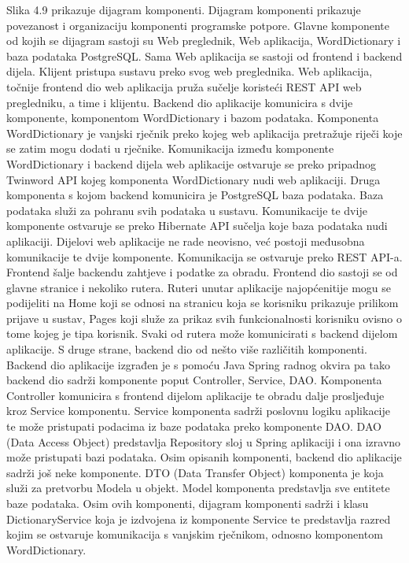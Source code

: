 			 Slika 4.9 prikazuje dijagram komponenti. Dijagram komponenti prikazuje povezanost i organizaciju komponenti programske potpore. Glavne komponente od kojih se dijagram sastoji su Web preglednik, Web aplikacija, WordDictionary i baza podataka PostgreSQL. Sama Web aplikacija se sastoji od frontend i backend dijela. Klijent pristupa sustavu preko svog web preglednika. Web aplikacija, točnije frontend dio web aplikacija pruža sučelje koristeći REST API web pregledniku, a time i klijentu. Backend dio aplikacije komunicira s dvije komponente, komponentom WordDictionary i bazom podataka. Komponenta WordDictionary je vanjski rječnik preko kojeg web aplikacija pretražuje riječi koje se zatim mogu dodati u rječnike. Komunikacija između komponente WordDictionary i backend dijela web aplikacije ostvaruje se preko pripadnog Twinword API kojeg komponenta WordDictionary nudi web aplikaciji. Druga komponenta s kojom backend komunicira je PostgreSQL baza podataka. Baza podataka služi za pohranu svih podataka u sustavu. Komunikacije te dvije komponente ostvaruje se preko Hibernate API sučelja koje baza podataka nudi aplikaciji. Dijelovi web aplikacije ne rade neovisno, već postoji međusobna komunikacije te dvije komponente. Komunikacija se ostvaruje preko REST API-a. Frontend šalje backendu zahtjeve i podatke za obradu. Frontend dio sastoji se od glavne stranice i nekoliko rutera. Ruteri unutar aplikacije najopćenitije mogu se podijeliti na Home koji se odnosi na stranicu koja se korisniku prikazuje prilikom prijave u sustav, Pages koji služe za prikaz svih funkcionalnosti korisniku ovisno o tome kojeg je tipa korisnik. Svaki od rutera može komunicirati s backend dijelom aplikacije. S druge strane, backend dio od nešto više različitih komponenti. Backend dio aplikacije izgrađen je s pomoću Java Spring radnog okvira pa tako backend dio sadrži komponente poput Controller, Service, DAO. Komponenta Controller komunicira s frontend dijelom aplikacije te obradu dalje prosljeđuje kroz Service komponentu. Service komponenta sadrži poslovnu logiku aplikacije te može pristupati podacima iz baze podataka preko komponente DAO. DAO (Data Access Object) predstavlja Repository sloj u Spring aplikaciji i ona izravno može pristupati bazi podataka. Osim opisanih komponenti, backend dio aplikacije sadrži još neke komponente. DTO (Data Transfer Object) komponenta je koja služi za pretvorbu Modela u objekt. Model komponenta predstavlja sve entitete baze podataka. Osim ovih komponenti, dijagram komponenti sadrži i klasu DictionaryService koja je izdvojena iz komponente Service te predstavlja razred kojim se ostvaruje komunikacija s vanjskim rječnikom, odnosno komponentom WordDictionary.
			 